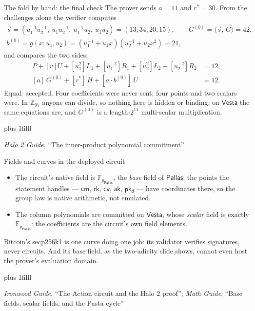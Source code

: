 \documentclass[aspectratio=169,11pt]{beamer}
\newcommand{\F}{\mathbb{F}}
\newcommand{\Pallas}{\ensuremath{\mathsf{Pallas}}}
\newcommand{\Vesta}{\ensuremath{\mathsf{Vesta}}}
\newcommand{\Fpp}{\ensuremath{\F_{p_{\Pallas}}}}
\newcommand{\cmsym}{\ensuremath{\mathsf{cm}}}
\newcommand{\cvsym}{\ensuremath{\mathsf{cv}}}
\newcommand{\rksym}{\ensuremath{\mathsf{rk}}}
\newcommand{\pkd}{\ensuremath{\mathsf{pk_d}}}
\newcommand{\aksym}{\ensuremath{\mathsf{ak}}}
\newcommand{\ip}[2]{\langle #1,\, #2 \rangle}
\newcommand{\src}[1]{\par\vskip0pt plus 1filll
  {\fontsize{6}{7.2}\selectfont\color{arbdim}\raggedright #1\par}}
\begin{document}
\begin{frame}{The fold by hand: the final check}
The prover sends $a = 11$ and $r^{*} = 30$. From the challenges alone
the verifier computes
\begin{gather*}
\vec s = (u_1^{-1}u_2^{-1},\ u_1 u_2^{-1},\ u_1^{-1}u_2,\ u_1 u_2)
= (13, 34, 20, 15), \qquad G^{(0)} = \ip{\vec s}{\vec G} = 42, \\
b^{(0)} = g(x; u_1, u_2) = (u_1^{-1} + u_1 x)(u_2^{-1} + u_2 x^2) = 21,
\end{gather*}
and compares the two sides:
\begin{align*}
P + [v]U + [u_1^2]L_1 + [u_1^{-2}]R_1 + [u_2^2]L_2 + [u_2^{-2}]R_2
  &= 12, \\
[a]\,G^{(0)} + [r^{*}]\,H + [a \cdot b^{(0)}]\,U &= 12 .
\end{align*}
Equal: accepted. Four coefficients were never sent; four points and two
scalars were. In $\mathbb{Z}_{97}$ anyone can divide, so nothing here is
hidden or binding; on \Vesta{} the same equations are, and $G^{(0)}$ is
a length-$2^{11}$ multi-scalar multiplication.
\src{\emph{Halo 2 Guide}, ``The inner-product polynomial commitment''}
\end{frame}

\begin{frame}{Fields and curves in the deployed circuit}
\begin{itemize}
  \item The circuit's native field is $\Fpp$, the \emph{base} field of
    \Pallas: the points the statement handles --- $\cmsym$, $\rksym$,
    $\cvsym$, $\aksym$, $\pkd$ --- have coordinates there, so the group
    law is native arithmetic, not emulated.
  \item The column polynomials are committed on \Vesta, whose
    \emph{scalar} field is exactly $\Fpp$: the coefficients are the
    circuit's own field elements.
\end{itemize}
Bitcoin's secp256k1 is one curve doing one job: its validator verifies
signatures, never circuits. And its base field, as the two-adicity slide
shows, cannot even host the prover's evaluation domain.
\src{\emph{Ironwood Guide}, ``The Action circuit and the Halo 2 proof'';
\emph{Math Guide}, ``Base fields, scalar fields, and the Pasta cycle''}
\end{frame}
\end{document}
